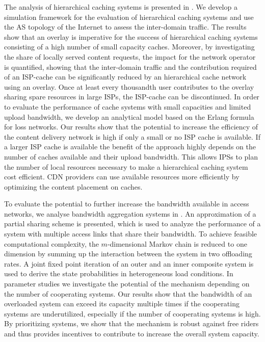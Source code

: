 The analysis of hierarchical caching systems is presented in .
We develop a simulation framework for the evaluation of hierarchical caching systems and use the AS topology of the Internet to assess the inter-domain traffic.
The results show that an overlay is imperative for the success of hierarchical caching systems consisting of a high number of small capacity caches.
Moreover, by investigating the share of locally served content requests, the impact for the network operator is quantified, showing that the inter-domain traffic and the contribution required of an ISP-cache can be significantly reduced by an hierarchical cache network using an overlay.
Once at least every thousandth user contributes to the overlay sharing spare resources in large ISPs, the ISP-cache can be discontinued.
In order to evaluate the performance of cache systems with small capacities and limited upload bandwidth, we develop an analytical model based on the Erlang formula for loss networks.
Our results show that the potential to increase the efficiency of the content delivery network is high if only a small or no ISP cache is available.
If a larger ISP cache is available the benefit of the approach highly depends on the number of caches available and their upload bandwidth.
This allows IPSs to plan the number of local resources necessary to make a hierarchical caching system cost efficient.
CDN providers can use available resources more efficiently by optimizing the content placement on caches.

To evaluate the potential to further increase the bandwidth available in access networks, we analyse bandwidth aggregation systems in .
An approximation of a partial sharing scheme is presented, which is used to analyze the performance of a system with multiple access links that share their bandwidth.
To achieve feasible computational complexity, the $m$-dimensional Markov chain is reduced to one dimension by summing up the interaction between the system in two offloading rates.
A joint fixed point iteration of an outer and an inner composite system is used to derive the state probabilities in heterogeneous load conditions.
In parameter studies we investigate the potential of the mechanism depending on the number of cooperating systems.
Our results show that the bandwidth of an overloaded system can exceed its capacity multiple times if the cooperating systems are underutilized, especially if the number of cooperating systems is high.
By prioritizing systems, we show that the mechanism is robust against free riders and thus provides incentives to contribute to increase the overall system capacity.

